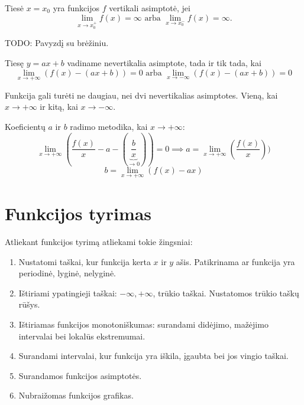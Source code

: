 \begin{defn}
  Tiesė $x = x_{0}$ yra funkcijos $f$ vertikali asimptotė, jei 
  \begin{equation*}
    \lim _{x \to x_{0}^{+}} f(x) = \infty \text{ arba }
    \lim _{x \to x_{0}^{-}} f(x) = \infty.
  \end{equation*}

  TODO: Pavyzdį su brėžiniu.
\end{defn}

\begin{defn}
  Tiesę $y = ax + b$ vadiname nevertikalia asimptote, tada ir tik tada, kai
  \begin{equation*}
    \lim _{x \to +\infty} (f(x) - (ax + b)) = 0 \text{ arba }
    \lim _{x \to -\infty} (f(x) - (ax + b)) = 0
  \end{equation*}

  \begin{note}
    Funkcija gali turėti ne daugiau, nei dvi nevertikalias asimptotes. 
    Vieną, kai $x \to +\infty$ ir kitą, kai $x \to -\infty$.
  \end{note}

  \begin{note}
    Koeficientų $a$ ir $b$ radimo metodika, kai $x \to +\infty$:
    \begin{equation*}
      \lim _{x \to +\infty} \left( \frac{f(x)}{x} - a - 
        \left( \underbrace{\frac{b}{x}}_{\to 0} \right) \right) = 0
        \implies a = \lim _{x \to +\infty} \left( \frac{f(x)}{x} \right))
    \end{equation*}
    \begin{equation*}
      b = \lim_{x \to +\infty} (f(x) - ax)
    \end{equation*}
  \end{note}
\end{defn}

\section{Funkcijos tyrimas}

Atliekant funkcijos tyrimą atliekami tokie žingsniai:
\begin{enumerate}
  \item Nustatomi taškai, kur funkcija kerta $x$ ir $y$ ašis. Patikrinama
    ar funkcija yra periodinė, lyginė, nelyginė.
  \item Ištiriami ypatingieji taškai: $-\infty, +\infty$, trūkio taškai.
    Nustatomos trūkio taškų rūšys.
  \item Ištiriamas funkcijos monotoniškumas: surandami didėjimo, mažėjimo
    intervalai bei lokalūs ekstremumai.
  \item Surandami intervalai, kur funkcija yra iškila, įgaubta bei jos
    vingio taškai.
  \item Surandamos funkcijos asimptotės.
  \item Nubraižomas funkcijos grafikas.
\end{enumerate}
